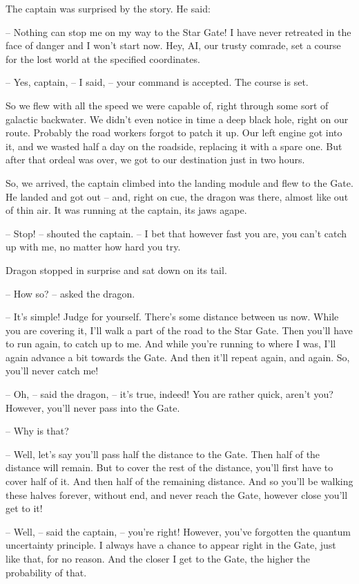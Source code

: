 \documentclass[ebook,twoside,final,openright]{memoir}
\begin{document}
\par
The captain was surprised by the story. He said:\par
– Nothing can stop me on my way to the Star Gate! I have never retreated in the face of danger and I won’t start now. Hey, AI, our trusty comrade, set a course for the lost world at the specified coordinates.\par
– Yes, captain, – I said, – your command is accepted. The course is set.\par
So we flew with all the speed we were capable of, right through some sort of galactic backwater. We didn’t even notice in time a deep black hole, right on our route. Probably the road workers forgot to patch it up. Our left engine got into it, and we wasted half a day on the roadside, replacing it with a spare one. But after that ordeal was over, we got to our destination just in two hours.\par
\par
So, we arrived, the captain climbed into the landing module and flew to the Gate. He landed and got out – and, right on cue, the dragon was there, almost like out of thin air. It was running at the captain, its jaws agape.\par
– Stop! – shouted the captain. – I bet that however fast you are, you can’t catch up with me, no matter how hard you try.\par
Dragon stopped in surprise and sat down on its tail.\par
– How so? – asked the dragon.\par
– It’s simple! Judge for yourself. There’s some distance between us now. While you are covering it, I’ll walk a part of the road to the Star Gate. Then you’ll have to run again, to catch up to me. And while you’re running to where I was, I’ll again advance a bit towards the Gate. And then it’ll repeat again, and again. So, you’ll never catch me!\par
– Oh, – said the dragon, – it’s true, indeed! You are rather quick, aren’t you? However, you’ll never pass into the Gate.\par
– Why is that?\par
– Well, let’s say you’ll pass half the distance to the Gate. Then half of the distance will remain. But to cover the rest of the distance, you’ll first have to cover half of it. And then half of the remaining distance. And so you’ll be walking these halves forever, without end, and never reach the Gate, however close you’ll get to it!\par
– Well, – said the captain, – you’re right! However, you’ve forgotten the quantum uncertainty principle. I always have a chance to appear right in the Gate, just like that, for no reason. And the closer I get to the Gate, the higher the probability of that.\par
\end{document}
